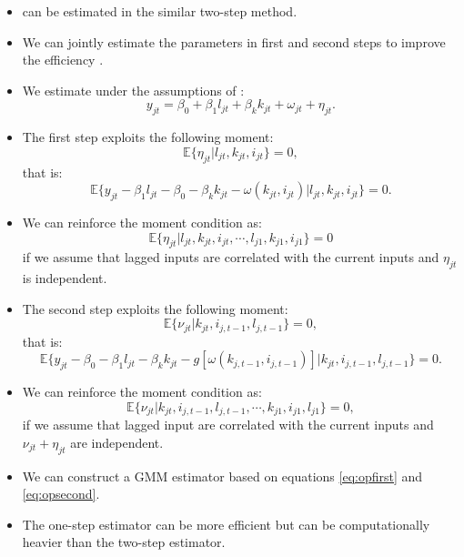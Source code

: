 \documentclass[
]{book}
\begin{document}
\begin{itemize}
\item
  \citet{Levinsohn2003} can be estimated in the similar two-step method.
\item
  We can jointly estimate the parameters in first and second steps to improve the efficiency \citep{Wooldridge2009}.
\item
  We estimate under the assumptions of \citet{Olley1996}:
  \begin{equation}
  y_{jt} = \beta_0 + \beta_1 l_{jt} + \beta_k k_{jt} + \omega_{jt} + \eta_{jt}.
  \end{equation}
\item
  The first step exploits the following moment:
  \begin{equation}
  \mathbb{E}\{\eta_{jt}|l_{jt}, k_{jt}, i_{jt}\} = 0,
  \end{equation}
  that is:
  \begin{equation}
  \mathbb{E}\{y_{jt} - \beta_1 l_{jt} - \beta_0 - \beta_k k_{jt} - \omega(k_{jt}, i_{jt})|l_{jt}, k_{jt}, i_{jt}\} = 0. \label{eq:opfirst}
  \end{equation}
\item
  We can reinforce the moment condition as:
  \begin{equation}
  \mathbb{E}\{\eta_{jt}|l_{jt}, k_{jt}, i_{jt}, \cdots, l_{j1}, k_{j1}, i_{j1}\} = 0
  \end{equation}
  if we assume that lagged inputs are correlated with the current inputs and \(\eta_{jt}\) is independent.
\item
  The second step exploits the following moment:
  \begin{equation}
  \mathbb{E}\{\nu_{jt}|k_{jt}, i_{j, t - 1}, l_{j, t - 1}\} = 0,
  \end{equation}
  that is:
  \begin{equation}
  \mathbb{E}\{y_{jt} - \beta_0 - \beta_1 l_{jt} - \beta_k k_{jt} - g[\omega(k_{j,t - 1}, i_{j, t - 1})]|k_{jt}, i_{j, t - 1}, l_{j, t - 1}\} = 0. \label{eq:opsecond}
  \end{equation}
\item
  We can reinforce the moment condition as:
  \begin{equation}
  \mathbb{E}\{\nu_{jt}|k_{jt}, i_{j, t - 1}, l_{j, t - 1}, \cdots, k_{j1}, i_{j1}, l_{j1}\} = 0,
  \end{equation}
  if we assume that lagged input are correlated with the current inputs and \(\nu_{jt} + \eta_{jt}\) are independent.
\item
  We can construct a GMM estimator based on equations \eqref{eq:opfirst} and \eqref{eq:opsecond}.
\item
  The one-step estimator can be more efficient but can be computationally heavier than the two-step estimator.
\end{itemize}
\end{document}
